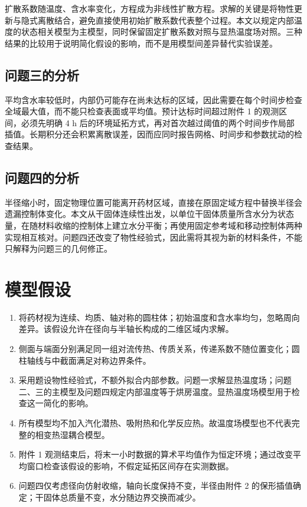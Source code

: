 \documentclass[withoutpreface,bwprint]{cumcmthesis}
\begin{document}
扩散系数随温度、含水率变化，方程成为非线性扩散方程。求解的关键是将物性更新与隐式离散结合，避免直接使用初始扩散系数代表整个过程。本文以规定内部温度的状态相关模型为主模型，同时保留固定扩散系数对照与显热温度场对照。三种结果的比较用于说明简化假设的影响，而不是用模型间差异替代实验误差。

\subsection{问题三的分析}

平均含水率较低时，内部仍可能存在尚未达标的区域，因此需要在每个时间步检查全域最大值，而不能只检查表面或平均值。预计达标时间超过附件 1 的观测区间，必须先明确 4 h 后的环境延拓方式，再对首次越过阈值的两个时间步作局部插值。长期积分还会积累离散误差，因而应同时报告网格、时间步和参数扰动的检查结果。

\subsection{问题四的分析}

半径缩小时，固定物理位置可能离开药材区域，直接在原固定域方程中替换半径会遗漏控制体变化。本文从干固体连续性出发，以单位干固体质量所含水分为状态量，在随材料收缩的控制体上建立水分平衡；再使用固定参考域和移动控制体两种实现相互核对。问题四还改变了物性经验式，因此需将其视为新的材料条件，不能只解释为问题三的几何修正。

\section{模型假设}

\begin{enumerate}[label=(\arabic*)]
\item 将药材视为连续、均质、轴对称的圆柱体；初始温度和含水率均匀，忽略周向差异。该假设允许在径向与半轴长构成的二维区域内求解。
\item 侧面与端面分别满足同一组对流传热、传质关系，传递系数不随位置变化；圆柱轴线与中截面满足对称边界条件。
\item 采用题设物性经验式，不额外拟合内部参数。问题一求解显热温度场；问题二、三的主模型及问题四规定内部温度等于烘房温度。显热温度场模型用于检查这一简化的影响。
\item 所有模型均不加入汽化潜热、吸附热和化学反应热。故温度场模型也不代表完整的相变热湿耦合模型。
\item 附件 1 观测结束后，将末一小时数据的算术平均值作为恒定环境；通过改变平均窗口检查该假设的影响，不假定延拓区间存在实测数据。
\item 问题四仅考虑径向仿射收缩，轴向长度保持不变，半径由附件 2 的保形插值确定；干固体总质量不变，水分随边界交换而减少。
\end{enumerate}
\end{document}
